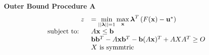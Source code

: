\textbf{Outer Bound Procedure A}
\begin{equation}\label{eq:OPTfeasOutRelaxa}
\begin{array}{rl}
 \ z &=\min\limits_{||\boldsymbol{\lambda}||=1}\max\limits_{\mathbf{x}} \boldsymbol{\lambda}^T\left(F(\mathbf{x})-\mathbf{u}^*\right) \\
 \text{subject to: } \ & A\mathbf{x}\leq \mathbf{b} \\
 	&\mathbf{b}\mathbf{b}^T-A\mathbf{x}\mathbf{b}^T-\mathbf{b}(A\mathbf{x})^T+AXA^T\geq O \\
 	&X \text{ is symmtric}
\end{array}
\end{equation}





